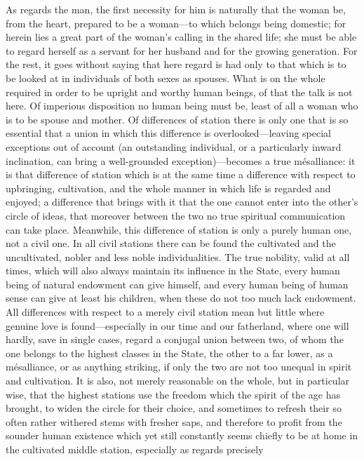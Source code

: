 \documentclass[12pt,a4paper]{book}
\begin{document}
As regards the man, the first necessity for him is naturally that the woman
be, from the heart, prepared to be a woman---to which belongs being
domestic; for herein lies a great part of the woman's calling in the shared
life; she must be able to regard herself as a servant for her husband and
for the growing generation. For the rest, it goes without saying that here
regard is had only to that which is to be looked at in individuals of both
sexes as spouses. What is on the whole required in order to be upright and
worthy human beings, of that the talk is not here. Of imperious disposition
no human being must be, least of all a woman who is to be spouse and
mother.
Of differences of station there is only one that is so essential that a
union in which this difference is overlooked---leaving special exceptions
out of account (an outstanding individual, or a particularly inward
inclination, can bring a well-grounded exception)---becomes a true
mésalliance: it is that difference of station which is at the same time a
difference with respect to upbringing, cultivation, and the whole manner in
which life is regarded and enjoyed; a difference that brings with it that
the one cannot enter into the other's circle of ideas, that moreover
between the two no true spiritual communication can take place. Meanwhile,
this difference of station is only a purely human one, not a civil one. In
all civil stations there can be found the cultivated and the uncultivated,
nobler and less noble individualities. The true nobility, valid at all
times, which will also always maintain its influence in the State, every
human being of natural endowment can give himself, and every human being of
human sense can give at least his children, when these do not too much lack
endowment. All differences with respect to a merely civil station mean but
little where genuine love is found---especially in our time and our
fatherland, where one will hardly, save in single cases, regard a conjugal
union between two, of whom the one belongs to the highest classes in the
State, the other to a far lower, as a mésalliance, or as anything striking,
if only the two are not too unequal in spirit and cultivation. It is also,
not merely reasonable on the whole, but in particular wise, that the
highest stations use the freedom which the spirit of the age has brought,
to widen the circle for their choice, and sometimes to refresh their so
often rather withered stems with fresher saps, and therefore to profit from
the sounder human existence which yet still constantly seems chiefly to be
at home in the cultivated middle station, especially as regards precisely
\end{document}
